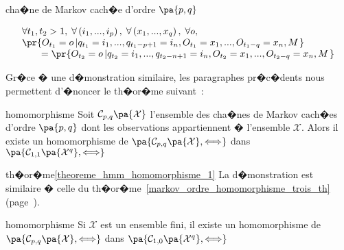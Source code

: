 \begin{xdefinition}{cha�ne de Markov cach�e d'ordre $\pa{p,q}$}
\begin{enumerate}
                $$
                \begin{array}{l}
                \forall t_{1},t_{2}>1,\;\forall\left(i_{1},...,i_{p}\right), \; 
                            \forall\left(x_{1},...,x_{q}\right), \; \forall o, \\
                \pr{ O_{t_{1}}=o\left|q_{t_{1}}=i_{1},...,q_{t_{1}-p+1}=i_{n},O_{t_{1}} =
                            x_{1},...,O_{t_{1}-q}=x_{n},M\right.  }  \\
                \quad\quad= \pr{  O_{t_{2}}=o\left| 
                     q_{t_{2}}=i_{1},...,q_{t_{2}-n+1}=i_{n},O_{t_{2}}=x_{1},...,O_{t_{2}-q}=x_{n},M\right.  }
                \end{array}
                $$
                
        \end{enumerate}
        \end{xdefinition}
        


Gr�ce � une d�monstration similaire, les paragraphes pr�c�dents nous permettent d'�noncer le th�or�me suivant~:

        \begin{xtheorem}{homomorphisme}%
        \label{theoreme_hmm_homomorphisme_1}%
        Soit $\mathcal{C}_{p,q} \pa{\mathcal{X}}$ l'ensemble des cha�nes de Markov cach�es d'ordre $\pa{p,q}$ 
        dont les observations
             appartiennent � l'ensemble $\mathcal{X}$. Alors il existe un homomorphisme de $\pa{\mathcal{C}_{p,q}
              \pa{\mathcal{X}},\Longleftrightarrow}$ dans $\pa{\mathcal{C}_{1,1} \pa{\mathcal{X}^q},\Longleftrightarrow}$
        \end{xtheorem}

\begin{xdemo}{th�or�me}{\ref{theoreme_hmm_homomorphisme_1}}
La d�monstration est similaire � celle du th�or�me~\ref{markov_ordre_homomorphisme_trois_th} (page~\pageref{markov_ordre_homomorphisme_trois_th}).
\end{xdemo}






        \begin{xcorollary}{homomorphisme}
        \label{corollaire_chaine_markov_cachee_1}%
        Si $\mathcal{X}$ est un ensemble fini, il existe un homomorphisme de 
        $\pa{\mathcal{C}_{p,q} \pa{\mathcal{X}},\Longleftrightarrow}$ dans
        $\pa{\mathcal{C}_{1,0} \pa{\mathcal{X}^q},\Longleftrightarrow}$
        \end{xcorollary}









